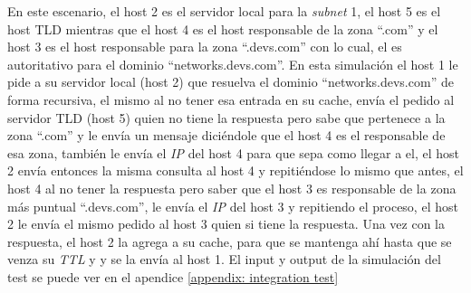 \documentclass[10pt,a4paper]{article}
\begin{document}
En este escenario, el host 2 es el servidor local para la \textit{subnet} 1, el host 5 es el host TLD mientras que el host 4 es el host responsable de la zona ``.com'' y el host 3 es el host responsable para la zona ``.devs.com'' con lo cual, el es autoritativo para el dominio ``networks.devs.com''. En esta simulación el host 1 le pide a su servidor local (host 2) que resuelva el dominio ``networks.devs.com'' de forma recursiva, el mismo al no tener esa entrada en su cache, envía el pedido al servidor TLD (host 5) quien no tiene la respuesta pero sabe que pertenece a la zona ``.com'' y le envía un mensaje diciéndole que el host 4 es el responsable de esa zona, también le envía el \textit{IP} del host 4 para que sepa como llegar a el, el host 2 envía entonces la misma consulta al host 4 y repitiéndose lo mismo que antes, el host 4 al no tener la respuesta pero saber que el host 3 es responsable de la zona más puntual ``.devs.com'', le envía el \textit{IP} del host 3 y repitiendo el proceso, el host 2 le envía el mismo pedido al host 3 quien si tiene la respuesta. Una vez con la respuesta, el host 2 la agrega a su cache, para que se mantenga ahí hasta que se venza su \textit{TTL} y y se la envía al host 1. El input y output de la simulación del test se puede ver en el apendice \ref{appendix: integration test} \\

\newpage
\end{document}
